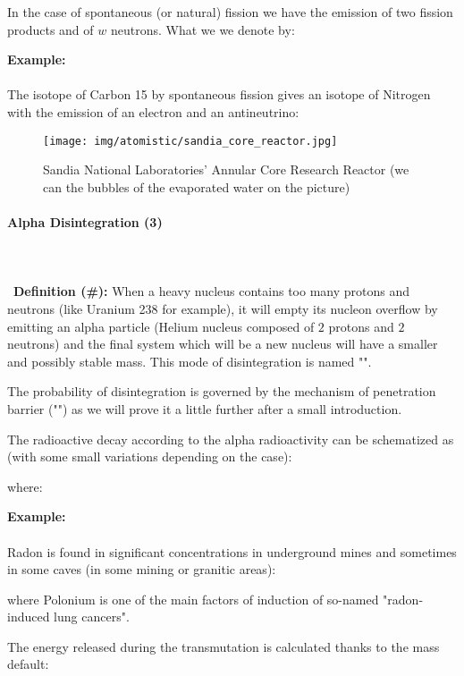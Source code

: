 	In the case of spontaneous (or natural) fission we have the emission of two fission products and of $w$ neutrons. What we we denote by:
	
	\begin{tcolorbox}[colframe=black,colback=white,sharp corners]
	\textbf{{\Large {}}Example:}\\\\
	The isotope of Carbon 15 by spontaneous fission gives an isotope of Nitrogen with the emission of an electron and an antineutrino:
	
	\end{tcolorbox}
	\begin{figure}[H]
		\centering
		\texttt{[image: img/atomistic/sandia\_core\_reactor.jpg]}
		\caption[]{Sandia National Laboratories' Annular Core Research Reactor (we can the bubbles of the evaporated water on the picture)}
	\end{figure}
	
	\paragraph{Alpha Disintegration (3)}\label{alpha disintegration}\mbox{}\\\\\
	\textbf{Definition (\#\mydef):} When a heavy nucleus contains too many protons and neutrons (like Uranium 238 for example), it will empty its nucleon overflow by emitting an alpha particle (Helium nucleus composed of $2$ protons and $2$ neutrons) and the final system which will be a new nucleus will have a smaller and possibly stable mass. This mode of disintegration is named "".
	
	The probability of disintegration is governed by the mechanism of penetration barrier ("") as we will prove it a little further after a small introduction.

	The radioactive decay according to the alpha radioactivity can be schematized as (with some small variations depending on the case):
	
	where:
	
	\begin{tcolorbox}[colframe=black,colback=white,sharp corners]
	\textbf{{\Large {}}Example:}\\\\
	Radon is found in significant concentrations in underground mines and sometimes in some caves (in some mining or granitic areas):
	
	where Polonium is one of the main factors of induction of so-named "radon-induced lung cancers".
	\end{tcolorbox}
	The energy released during the transmutation is calculated thanks to the mass default:
	
